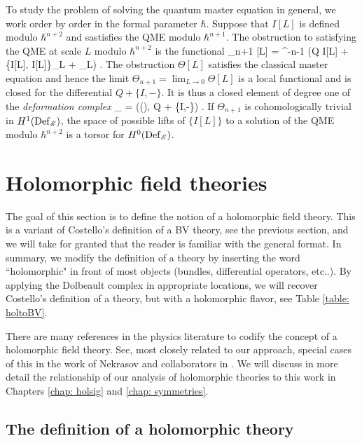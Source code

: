 To study the problem of solving the quantum master equation in general, we work order by order in the formal parameter $\hbar$.
Suppose that $I[L]$ is defined modulo $\hbar^{n+2}$ and sastisfies the QME modulo $\hbar^{n+1}$.
The obstruction to satisfying the QME at scale $L$ modulo $\hbar^{n+2}$ is the functional
\ben
\Theta_{n+1} [L] = \hbar^{-n-1} (Q I[L] + \{I[L], I[L]\}_L + \hbar \Delta_L) .
\een
The obstruction $\Theta[L]$ satisfies the classical master equation and hence the limit $\Theta_{n+1} = \lim_{L \to 0} \Theta[L]$ is a local functional and is closed for the differential $Q + \{I, -\}$. 
It is thus a closed element of degree one of the {\em deformation complex}
\ben
\Def_{\sE} = \left(\oloc(\sE), Q + \{I,-\}\right) .
\een
If $\Theta_{n+1}$ is cohomologically trivial in $H^1({\rm Def}_{\mathscr E})$, the space of possible lifts of $\{I[L]\}$ to a solution of the QME modulo $\hbar^{n+2}$ is a torsor for $H^0({\rm Def}_{\mathscr E})$. 


\section{Holomorphic field theories} \label{sec: hol theory}

The goal of this section is to define the notion of a holomorphic field theory. 
This is a variant of Costello's definition of a BV theory, see the previous section, and we will take for granted that the reader is familiar with the general format.
In summary, we modify the definition of a theory by inserting the word ``holomorphic" in front of most objects (bundles, differential operators, etc..).
By applying the Dolbeault complex in appropriate locations, we will recover Costello's definition of a theory, but with a holomorphic flavor, see Table \ref{table: holtoBV}. 

There are many references in the physics literature to codify the concept of a holomorphic field theory.
See, most closely related to our approach, special cases of this in the work of Nekrasov and collaborators in \cite{NekThesis, NekChiral, NekCFT}. 
We will discuss in more detail the relationship of our analysis of holomorphic theories to this work in Chapters \ref{chap: holsig} and \ref{chap: symmetries}. 

\subsection{The definition of a holomorphic theory}

